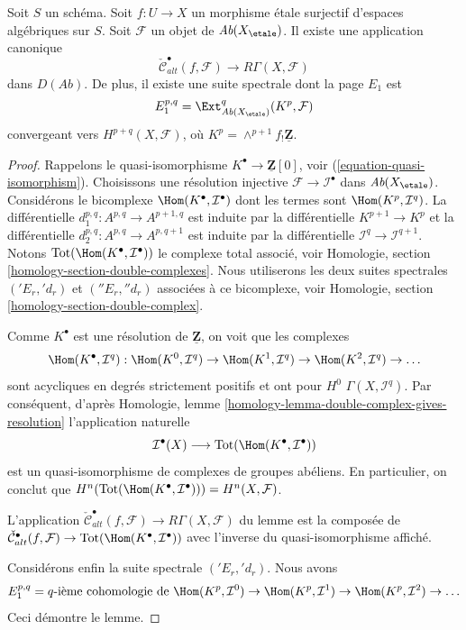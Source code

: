 \begin{lemma}
\label{lemma-alternating-cech-to-cohomology}
Soit $S$ un schéma. Soit $f : U \to X$ un morphisme étale surjectif
d'espaces algébriques sur $S$. Soit $\mathcal{F}$ un objet de
$\textit{Ab}(X_\etale)$. Il existe une application canonique
$$
\check{\mathcal{C}}^\bullet_{alt}(f, \mathcal{F})
\longrightarrow
R\Gamma(X, \mathcal{F})
$$
dans $D(\textit{Ab})$. De plus, il existe une suite spectrale dont la page $E_1$ est
$$
E_1^{p, q} =
\Ext_{\textit{Ab}(X_\etale)}^q(K^p, \mathcal{F})
$$
convergeant vers $H^{p + q}(X, \mathcal{F})$, où
$K^p = \wedge^{p + 1}f_!\underline{\mathbf{Z}}$.
\end{lemma}

\begin{proof}
Rappelons le quasi-isomorphisme
$K^\bullet \to \underline{\mathbf{Z}}[0]$, voir
(\ref{equation-quasi-isomorphism}).
Choisissons une résolution injective $\mathcal{F} \to \mathcal{I}^\bullet$
dans $\textit{Ab}(X_\etale)$. Considérons le bicomplexe
$\Hom(K^\bullet, \mathcal{I}^\bullet)$ dont les termes sont
$\Hom(K^p, \mathcal{I}^q)$. La différentielle
$d_1^{p, q} : A^{p, q} \to A^{p + 1, q}$
est induite par la différentielle $K^{p + 1} \to K^p$
et la différentielle $d_2^{p, q} : A^{p, q} \to A^{p, q + 1}$ est induite par
la différentielle
$\mathcal{I}^q \to \mathcal{I}^{q + 1}$.
Notons $\text{Tot}(\Hom(K^\bullet, \mathcal{I}^\bullet))$
le complexe total associé, voir
Homologie, section \ref{homology-section-double-complexes}.
Nous utiliserons les deux suites spectrales
$({}'E_r, {}'d_r)$ et $({}''E_r, {}''d_r)$
associées à ce bicomplexe, voir
Homologie, section \ref{homology-section-double-complex}.

\medskip\noindent
Comme $K^\bullet$ est une résolution de $\underline{\mathbf{Z}}$,
on voit que les complexes
$$
\Hom(K^\bullet, \mathcal{I}^q) :
\Hom(K^0, \mathcal{I}^q) \to
\Hom(K^1, \mathcal{I}^q) \to
\Hom(K^2, \mathcal{I}^q) \to \ldots
$$
sont acycliques en degrés strictement positifs et ont pour $H^0$
$\Gamma(X, \mathcal{I}^q)$. Par conséquent, d'après
Homologie, lemme \ref{homology-lemma-double-complex-gives-resolution}
l'application naturelle
$$
\mathcal{I}^\bullet(X) \longrightarrow
\text{Tot}(\Hom(K^\bullet, \mathcal{I}^\bullet))
$$
est un quasi-isomorphisme de complexes de groupes abéliens.
En particulier, on conclut que
$H^n(\text{Tot}(\Hom(K^\bullet, \mathcal{I}^\bullet))) = H^n(X, \mathcal{F})$.

\medskip\noindent
L'application $\check{\mathcal{C}}^\bullet_{alt}(f, \mathcal{F}) \to
R\Gamma(X, \mathcal{F})$ du lemme est la composée de
$\check{\mathcal{C}}^\bullet_{alt}(f, \mathcal{F}) \to
\text{Tot}(\Hom(K^\bullet, \mathcal{I}^\bullet))$
avec l'inverse du quasi-isomorphisme affiché.

\medskip\noindent
Considérons enfin la suite spectrale $({}'E_r, {}'d_r)$.
Nous avons
$$
E_1^{p, q} = q\text{-ième cohomologie de }
\Hom(K^p, \mathcal{I}^0) \to
\Hom(K^p, \mathcal{I}^1) \to
\Hom(K^p, \mathcal{I}^2) \to \ldots
$$
Ceci démontre le lemme.
\end{proof}

